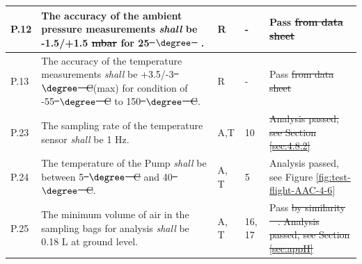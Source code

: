 \documentclass[a4paper,12pt,oneside]{article} %
\providecommand{\DIFaddtex}[1]{{\protect\color{blue}\uwave{#1}}} %
\providecommand{\DIFdeltex}[1]{{\protect\color{red}\sout{#1}}}                      %
\providecommand{\DIFaddbegin}{} %
\providecommand{\DIFaddend}{} %
\providecommand{\DIFdelbegin}{} %
\providecommand{\DIFdelend}{} %
\providecommand{\DIFadd}[1]{\texorpdfstring{\DIFaddtex{#1}}{#1}} %
\providecommand{\DIFdel}[1]{\texorpdfstring{\DIFdeltex{#1}}{}} %
\newcommand{\DIFscaledelfig}{0.5}
\newlength{\DIFdelgraphicswidth} %
\newlength{\DIFdelgraphicsheight} %
\newcommand{\DIFaddincludegraphics}[2][]{{\color{blue}\fbox{\DIFOincludegraphics[#1]{#2}}}} %
\newcommand{\DIFdelincludegraphics}[2][]{%
\sbox{\DIFdelgraphicsbox}{\DIFOincludegraphics[#1]{#2}}%
\settoboxwidth{\DIFdelgraphicswidth}{\DIFdelgraphicsbox} %
\settoboxtotalheight{\DIFdelgraphicsheight}{\DIFdelgraphicsbox} %
\scalebox{\DIFscaledelfig}{%
\parbox[b]{\DIFdelgraphicswidth}{\usebox{\DIFdelgraphicsbox}\\[-\baselineskip] \rule{\DIFdelgraphicswidth}{0em}}\llap{\resizebox{\DIFdelgraphicswidth}{\DIFdelgraphicsheight}{%
\setlength{\unitlength}{\DIFdelgraphicswidth}%
\begin{picture}(1,1)%
\thicklines\linethickness{2pt} %
{\color[rgb]{1,0,0}\put(0,0){\framebox(1,1){}}}%
{\color[rgb]{1,0,0}\put(0,0){\line( 1,1){1}}}%
{\color[rgb]{1,0,0}\put(0,1){\line(1,-1){1}}}%
\end{picture}%
}\hspace*{3pt}}} %
} %
\DeclareRobustCommand{\DIFaddbegin}{\DIFOaddbegin \let\includegraphics\DIFaddincludegraphics} %
\DeclareRobustCommand{\DIFaddend}{\DIFOaddend \let\includegraphics\DIFOincludegraphics} %
\DeclareRobustCommand{\DIFdelbegin}{\DIFOdelbegin \let\includegraphics\DIFdelincludegraphics} %
\DeclareRobustCommand{\DIFdelend}{\DIFOaddend \let\includegraphics\DIFOincludegraphics} %
\begin{document}
\begin{longtable}[]{|m{}| m{} |m{} |m{}|m{}|}
P.12 & The accuracy of the ambient pressure measurements \textit{shall} be -1.5/+1.5 \DIFdelbegin \DIFdel{mbar }\DIFdelend \DIFaddbegin \DIFadd{hPa }\DIFaddend for 25\DIFdelbegin \DIFdel{\mbox{%
$\degree$
}%
}\DIFdelend \DIFaddbegin \DIFadd{\mbox{%
$\degree{C}$
}%
}\DIFaddend .                                                                              &        R      &  -          & Pass        \DIFdelbegin \DIFdel{from data sheet       }\DIFdelend \\ \hline %
P.13 & The accuracy of the temperature measurements \textit{shall} be +3.5/-3\DIFdelbegin \DIFdel{\mbox{%
$\degree$
}%
C}\DIFdelend \DIFaddbegin \DIFadd{\mbox{%
$\degree{C}$
}%
}\DIFaddend (max) for condition of -55\DIFdelbegin \DIFdel{\mbox{%
$\degree$
}%
C }\DIFdelend \DIFaddbegin \DIFadd{\mbox{%
$\degree{C}$
}%
}\DIFaddend to 150\DIFdelbegin \DIFdel{\mbox{%
$\degree$
}%
C}\DIFdelend \DIFaddbegin \DIFadd{\mbox{%
$\degree{C}$
}%
}\DIFaddend .                                   &       R       & -            &    Pass   \DIFdelbegin \DIFdel{from data sheet    }\DIFdelend \\ \hline %


P.23 & The sampling rate of the temperature sensor \textit{shall} be 1 Hz.                                                                                    &         A,T     & 10            &  \DIFdelbegin \DIFdel{Analysis passed, see Section \ref{sec:4.8.2}      }\DIFdelend \DIFaddbegin \DIFadd{Pass       }\DIFaddend \\ \hline %
P.24 & The temperature of the Pump \textit{shall} be between 5\DIFdelbegin \DIFdel{\mbox{%
$\degree$
}%
C }\DIFdelend \DIFaddbegin \DIFadd{\mbox{%
$\degree{C}$
}%
}\DIFaddend and 40\DIFdelbegin \DIFdel{\mbox{%
$\degree$
}%
C}\DIFdelend \DIFaddbegin \DIFadd{\mbox{%
$\degree{C}$
}%
}\DIFaddend .                                                                                                    &       A, T       & 5           & Analysis passed, see Figure \ref{fig:test-flight-AAC-4-6}\DIFaddbegin \DIFadd{, Test ongoing.        }\DIFaddend \\ \hline
P.25 & The minimum volume of air in the sampling bags for analysis \textit{shall} be 0.18 L at ground level.                                                                                                    &       A, T       & 16, 17            &  Pass                     \DIFdelbegin \DIFdel{by similarity \mbox{%
\cite{LISA}}\hspace{0pt}%
. Analysis passed, see Section \ref{sec:appH}                        }\DIFdelend \\ \hline


\end{longtable}
\end{document}
